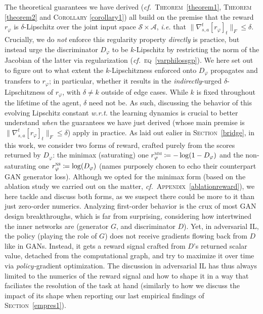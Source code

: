 The theoretical guarantees we have derived
(\textit{cf.}~\textsc{Theorem}~\ref{theorem1},
\textsc{Theorem} \ref{theorem2} and \textsc{Corollary} \ref{corollary1})
all build on the premise that the reward $r_\varphi$
is $\delta$-Lipschitz over the joint input space $\mathcal{S} \times \mathcal{A}$,
\textit{i.e.} that $\lVert \nabla_{s,a}^t[r_\varphi]_t \rVert _F \leq \delta$.
Crucially, we do \emph{not} enforce this regularity property \emph{directly} is practice, but instead
urge the discriminator $D_\varphi$ to be $k$-Lipschitz by restricting the norm of the Jacobian of the latter
via regularization (\textit{cf.}~\textsc{eq}~\ref{varphilossgp}).
We here set out to figure out to what extent the $k$-Lipschitzness enforced onto $D_\varphi$
propagates and transfers to $r_\varphi$; in particular, whether it results in
the \emph{indirectly}-urged $\delta$-Lipschitzness of $r_\varphi$,
with $\delta \neq k$ outside of edge cases.
While $k$ is fixed throughout the lifetime of the agent, $\delta$ need not be.
As such, discussing the behavior of this evolving Lipschitz constant \textit{w.r.t.} the learning dynamics
is crucial to better understand \emph{when} the guarantees we have just derived
(whose main premise is $\lVert \nabla_{s,a}^t[r_\varphi]_t \rVert _F \leq \delta$) apply in practice.
As laid out ealier in \textsc{Section}~\ref{bridge}, in this work, we consider two forms of reward,
crafted purely from the scores returned by $D_\varphi$:
the minimax (saturating) one $r_\varphi^\textsc{mm} \coloneqq -\log(1-D_\varphi)$
and the non-saturating one $r_\varphi^\textsc{ns} \coloneqq \log(D_\varphi)$
(names purposely chosen to echo their counterpart GAN generator loss).
Although we opted for the minimax form (based on the ablation study we carried out on the matter,
\textit{cf.}~\textsc{Appendix}~\ref{ablationreward}), we here tackle and discuss both forms,
as we suspect there could be more to it than just zero-order numerics.
Analyzing first-order behavior is the crux of most GAN design breakthroughs, which is far from surprising, considering
how intertwined the inner networks are (generator $G$, and discriminator $D$). Yet, in adversarial IL,
the policy (playing the role of $G$) does not receive gradients flowing back from $D$ like in GANs. Instead, it gets
a reward signal crafted from $D$'s returned scalar value, detached from the computational graph,
and try to maximize it over time via \emph{policy-}gradient optimization.
The discussion in adversarial IL has thus always limited to the numerics of the reward signal and
how to shape it in a way that faciliates the resolution of the task at hand (similarly to how we discuss
the impact of its shape when reporting our last empirical findings of \textsc{Section}~\ref{empres1}).


